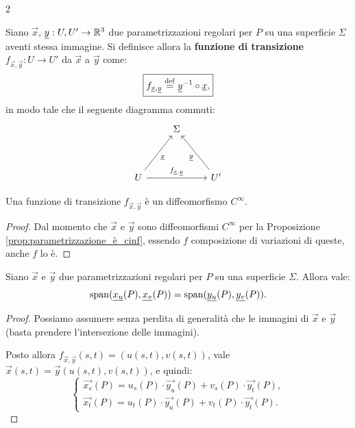 \begin{multicols*}{2}
    \begin{definition}
        Siano $\vec{x}$, ${\underline{y}} : U, U' \to \mathbb{R}^3$ due parametrizzazioni regolari per $P$
        su una superficie $\Sigma$ aventi stessa immagine. Si definisce allora la
        \textbf{funzione di transizione} $f_{\vec{x}, \vec{y}} : U \to U'$ da $\vec{x}$ a $\vec{y}$ come:
        \[
            \boxed{f_{{\underline{x}}, {\underline{y}}} \overset{\mathrm{def}}{=} {\underline{y}}^{-1} \circ {\underline{x}},}
        \]
        in modo tale che il seguente diagramma commuti:
        \[\begin{tikzcd}
                & \Sigma \\
                \\
                U && {U'}
                \arrow["{\vec{x}}"', from=3-1, to=1-2]
                \arrow["f_{\vec{x}, \vec{y}}", from=3-1, to=3-3]
                \arrow["{\vec{y}}", from=3-3, to=1-2]
            \end{tikzcd}\]
    \end{definition}

    \begin{proposition}
        Una funzione di transizione $f_{\vec{x}, \vec{y}}$ è
        un diffeomorfismo $C^\infty$.
    \end{proposition}

    \begin{proof}
        Dal momento che $\vec{x}$ e $\vec{y}$ sono diffeomorfismi $C^\infty$ per
        la Proposizione \ref{prop:parametrizzazione_è_cinf}, essendo
        $f$ composizione di variazioni di queste, anche $f$ lo è.
    \end{proof}

    \begin{proposition} \label{prop:stesso_piano_tangente_param_regolari}
        Siano $\vec{x}$ e $\vec{y}$ due parametrizzazioni regolari per $P$ su una
        superficie $\Sigma$. Allora vale:
        \[ \operatorname{span}({\underline{x_u}}(P), {\underline{x_v}}(P)) = \operatorname{span}({\underline{y_u}}(P), {\underline{y_v}}(P)). \]
    \end{proposition}

    \begin{proof}
        Possiamo assumere senza perdita di generalità che le immagini di $\vec{x}$ e $\vec{y}$ (basta
        prendere l'intersezione delle immagini). \smallskip

        Posto allora $f_{\vec{x}, \vec{y}}(s, t) = (u(s, t), v(s, t))$,
        vale $\vec{x}(s, t) = \vec{y}(u(s, t), v(s, t))$, e quindi:
        \[
            \begin{cases}
                \vec{x_s}(P) = u_s(P) \cdot \vec{y_u}(P) + v_s(P) \cdot \vec{y_t}(P), \\
                \vec{x_t}(P) = u_t(P) \cdot \vec{y_u}(P) + v_t(P) \cdot \vec{y_t}(P).
            \end{cases}
        \]


\end{proof}
\end{multicols*}
